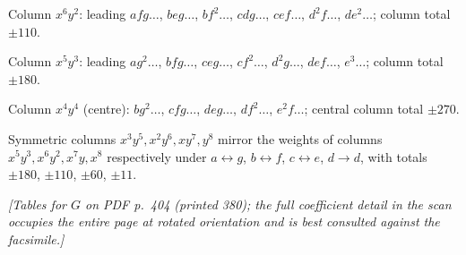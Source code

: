\documentclass[11pt]{article}
\begin{document}
\noindent
Column $x^{6}y^{2}$: leading $afg\ldots$, $beg\ldots$, $bf^{2}\ldots$, $cdg\ldots$, $cef\ldots$, $d^{2}f\ldots$, $de^{2}\ldots$; column total $\pm 110$.
\smallskip

\noindent
Column $x^{5}y^{3}$: leading $ag^{2}\ldots$, $bfg\ldots$, $ceg\ldots$, $cf^{2}\ldots$, $d^{2}g\ldots$, $def\ldots$, $e^{3}\ldots$; column total $\pm 180$.
\smallskip

\noindent
Column $x^{4}y^{4}$ (centre): $bg^{2}\ldots$, $cfg\ldots$, $deg\ldots$, $df^{2}\ldots$, $e^{2}f\ldots$; central column total $\pm 270$.
\smallskip

\noindent
Symmetric columns $x^{3}y^{5},x^{2}y^{6},xy^{7},y^{8}$ mirror the
weights of columns $x^{5}y^{3},x^{6}y^{2},x^{7}y,x^{8}$ respectively
under $a\leftrightarrow g$, $b\leftrightarrow f$, $c\leftrightarrow
e$, $d\to d$, with totals $\pm 180$, $\pm 110$, $\pm 60$, $\pm 11$.

\medskip
\noindent
\textit{[Tables for $G$ on PDF p.~404 (printed 380); the full
coefficient detail in the scan occupies the entire page at rotated
orientation and is best consulted against the facsimile.]}

\newpage
\end{document}
